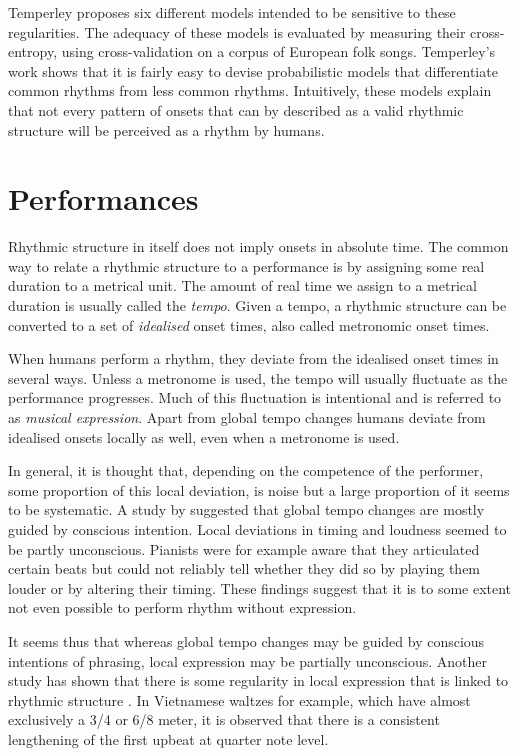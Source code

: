 Temperley proposes six different models intended to be sensitive to these regularities. The adequacy of these models is evaluated by measuring their cross-entropy, using cross-validation on a corpus of European folk songs. Temperley's work shows that it is fairly easy to devise probabilistic models that differentiate common rhythms from less common rhythms. Intuitively, these models explain that not every pattern of onsets that can by described as a valid rhythmic structure will be perceived as a rhythm by humans. 


\section{Performances}
\label{sec:performances}

Rhythmic structure in itself does not imply onsets in absolute time. The common way to relate a rhythmic structure to a performance is by assigning some real duration to a metrical unit. The amount of real time we assign to a metrical duration is usually called the \textit{tempo}. Given a tempo, a rhythmic structure can be converted to a set of \textit{idealised} onset times, also called metronomic onset times. 

When humans perform a rhythm, they deviate from the idealised onset times in several ways. Unless a metronome is used, the tempo will usually fluctuate as the performance progresses. Much of this fluctuation is intentional and is referred to as \textit{musical expression}. Apart from global tempo changes humans deviate from idealised onsets locally as well, even when a metronome is used. 

In general, it is thought that, depending on the competence of the performer, some proportion of this local deviation, is noise but a large proportion of it seems to be systematic. A study by \citet{palmer1989mapping} suggested that global tempo changes are mostly guided by conscious intention. Local deviations in timing and loudness seemed to be partly unconscious. Pianists were for example aware that they articulated certain beats but could not reliably tell whether they did so by playing them louder or by altering their timing. These findings suggest that it is to some extent not even possible to perform rhythm without expression.

It seems thus that whereas global tempo changes may be guided by conscious intentions of phrasing, local expression may be partially unconscious. Another study has shown that there is some regularity in local expression that is linked to rhythmic structure \citep{bengtsson1983analysis}. In Vietnamese waltzes for example, which have almost exclusively a 3/4 or 6/8 meter, it is observed that there is a consistent lengthening of the first upbeat at quarter note level.

